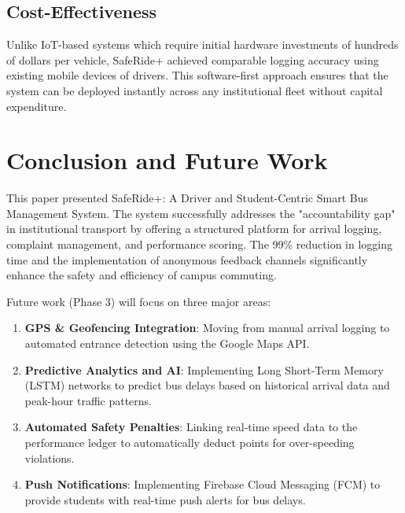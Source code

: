 \documentclass[conference]{IEEEtran}
\begin{document}
\subsection{Cost-Effectiveness}
Unlike IoT-based systems which require initial hardware investments of hundreds of dollars per vehicle, SafeRide+ achieved comparable logging accuracy using existing mobile devices of drivers. This software-first approach ensures that the system can be deployed instantly across any institutional fleet without capital expenditure.

\section{Conclusion and Future Work}
This paper presented SafeRide+: A Driver and Student-Centric Smart Bus Management System. The system successfully addresses the "accountability gap" in institutional transport by offering a structured platform for arrival logging, complaint management, and performance scoring. The 99\% reduction in logging time and the implementation of anonymous feedback channels significantly enhance the safety and efficiency of campus commuting.

Future work (Phase 3) will focus on three major areas:
\begin{enumerate}
    \item \textbf{GPS & Geofencing Integration}: Moving from manual arrival logging to automated entrance detection using the Google Maps API.
    \item \textbf{Predictive Analytics and AI}: Implementing Long Short-Term Memory (LSTM) networks to predict bus delays based on historical arrival data and peak-hour traffic patterns.
    \item \textbf{Automated Safety Penalties}: Linking real-time speed data to the performance ledger to automatically deduct points for over-speeding violations.
    \item \textbf{Push Notifications}: Implementing Firebase Cloud Messaging (FCM) to provide students with real-time push alerts for bus delays.
\end{enumerate}


\end{document}
